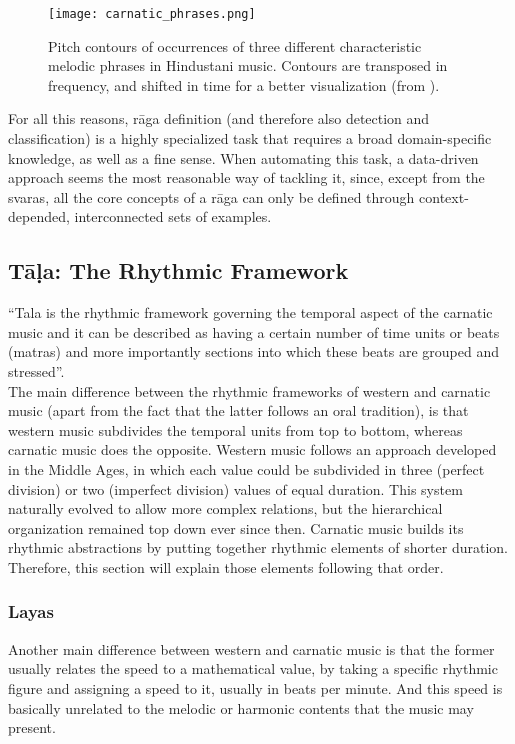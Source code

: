\begin{figure}
  \centering
  \texttt{[image: carnatic\_phrases.png]}
  \caption{Pitch contours of occurrences of three different characteristic melodic phrases in Hindustani music. Contours are transposed in frequency, and shifted in time for a better visualization (from \cite[p.21]{gulati}).}
  \label{fig:carnatic-phrases}
\end{figure}


For all this reasons, r\=aga definition (and therefore also detection and classification) is a highly specialized task that requires a broad domain-specific knowledge, as well as a fine sense. When automating this task, a data-driven approach seems the most reasonable way of tackling it, since, except from the svaras, all the core concepts of a r\=aga can only be defined through context-depended, interconnected sets of examples.


\subsection{T\=a\d{l}a: The Rhythmic Framework}

``Tala is the rhythmic framework governing the temporal aspect of the carnatic music and it can be described as having a certain number of time units or beats (matras) and more importantly sections into which these beats are grouped and stressed''\cite{indian-corpora}.\\

The main difference between the rhythmic frameworks of western and carnatic music (apart from the fact that the latter follows an oral tradition), is that western music subdivides the temporal units from top to bottom, whereas carnatic music does the opposite. Western music follows an approach developed in the Middle Ages, in which each value could be subdivided in three (perfect division) or two (imperfect division) values of equal duration\cite[ch.XIV]{hoppin}. This system naturally evolved to allow more complex relations, but the hierarchical organization remained top down ever since then. Carnatic music builds its rhythmic abstractions by putting together rhythmic elements of shorter duration. Therefore, this section will explain those elements following that order.

\subsubsection{Layas}


Another main difference between western and carnatic music is that the former usually relates the speed to a mathematical value, by taking a specific rhythmic figure and assigning a speed to it, usually in beats per minute. And this speed is basically unrelated to the melodic or harmonic contents that the music may present.\\

